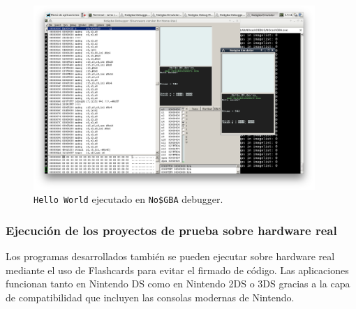 \begin{figure}[h!]
	\caption{{\tt Hello World} ejecutado en {\tt No\$GBA} debugger.}
	\label{fig:dependency}
	\centering
	\includegraphics[width=0.95\textwidth]{P1Media/NoCashDebug}
\end{figure}
	
	\subsubsection{Ejecución de los proyectos de prueba sobre hardware real}
	
	Los programas desarrollados también se pueden ejecutar sobre hardware real mediante el uso de Flashcards para evitar el firmado de código. Las aplicaciones funcionan tanto en Nintendo DS como en Nintendo 2DS o 3DS gracias a la capa de compatibilidad que incluyen las consolas modernas de Nintendo.
	
